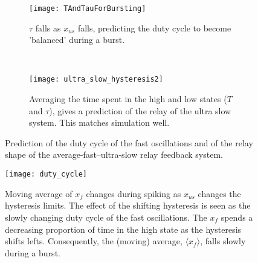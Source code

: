 \documentclass[a4paper, 12pt]{article}
\begin{document}
\begin{figure}[tbp]
    \centering
    \begin{subfigure}[t]{0.45\textwidth}
        \texttt{[image: TAndTauForBursting]}
        \caption{$\tau$ falls as $x_{us}$ falls, predicting the duty cycle to become 'balanced' during a burst.}
        \label{fig:TandTau}
    \end{subfigure}
    ~ %
    \begin{subfigure}[t]{0.45\textwidth}
        \texttt{[image: ultra\_slow\_hysteresis2]}
        \caption{Averaging the time spent in the high and low states ($T$ and $\tau$), gives a prediction of the relay of the ultra slow system. This matches simulation well.}
        \label{fig:ultra_slow_hysteresis}
    \end{subfigure}
\caption{Prediction of the duty cycle of the fast oscillations and of the relay shape of the average-fast--ultra-slow relay feedback system.}
\label{fig:bursting_step2.1}
\end{figure}


\begin{figure}
\texttt{[image: duty\_cycle]}
\caption{Moving average of $x_f$ changes during spiking as $x_{us}$ changes the hysteresis limits. The effect of the shifting hysteresis is seen as the slowly changing duty cycle of the fast oscillations. The $x_f$ spends a decreasing proportion of time in the high state as the hysteresis shifts lefts. Consequently, the (moving) average, $ \langle x_f \rangle $, falls slowly during a burst.}
\label{fig:bursting_step3.1}
\end{figure}

\end{document}
